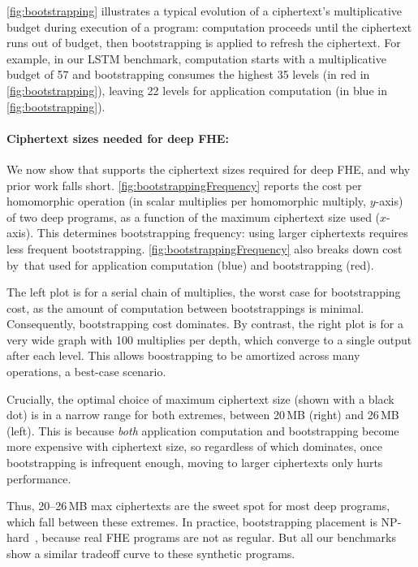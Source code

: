 \autoref{fig:bootstrapping} illustrates a typical evolution of a ciphertext's
multiplicative budget during execution of a program:
computation proceeds until the ciphertext runs out of budget, then bootstrapping is applied to refresh the ciphertext.
For example, in our LSTM benchmark, computation starts with a multiplicative budget of 57 and bootstrapping
consumes the highest 35 levels (in red in \autoref{fig:bootstrapping}), leaving 22 levels for application computation (in blue in \autoref{fig:bootstrapping}).


\paragraph{Ciphertext sizes needed for deep FHE:}
We now show that \name supports the ciphertext sizes required for deep FHE, and why prior work falls short.
\autoref{fig:bootstrappingFrequency} reports the cost per homomorphic operation
(in scalar multiplies per homomorphic multiply, $y$-axis) of two deep programs,
as a function of the maximum ciphertext size used ($x$-axis).
This determines bootstrapping frequency:
using larger ciphertexts requires less frequent bootstrapping.
\autoref{fig:bootstrappingFrequency} also breaks down cost by~that used for application computation (blue)
and bootstrapping (red).

The left plot is for a serial chain of multiplies, the worst case for bootstrapping cost, as the amount of computation between bootstrappings is minimal. Consequently, bootstrapping cost dominates.
By contrast, the right plot is for a very wide graph with 100 multiplies per depth, which converge to a single output after each level.
This allows boostrapping to be amortized across many operations, a best-case scenario.

Crucially, the optimal choice of maximum ciphertext size (shown with a black dot)
is in a narrow range for both extremes, between 20\,MB (right) and 26\,MB (left).
This is because \emph{both} application computation and bootstrapping become more expensive
with ciphertext size, so regardless of which dominates,
once bootstrapping is infrequent enough, moving to larger ciphertexts only hurts performance.

Thus, 20--26\,MB max ciphertexts are the sweet spot for most deep programs,
which fall between these extremes.
In practice, bootstrapping placement is NP-hard~\cite{benhamouda2017optimization}, because real FHE programs are not as regular.
But all our benchmarks show a similar tradeoff curve to these synthetic programs.

